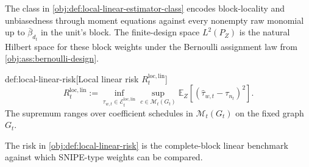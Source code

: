 \documentclass[11pt]{article}
\begin{document}
The class in \cref{obj:def:local-linear-estimator-class} encodes block-locality and unbiasedness through moment equations against every nonempty raw monomial up to \(\bar\beta_{d_t}\) in the unit's block. The finite-design space \(L^2(P_Z)\) is the natural Hilbert space for these block weights under the Bernoulli assignment law from \cref{obj:ass:bernoulli-design}.

\begin{definitionv}{def:local-linear-risk}[Local linear risk $R_t^{\mathrm{loc,lin}}$]
\[
R_t^{\mathrm{loc,lin}}
:=
\inf_{\widehat\tau_{w,t}\in\mathcal E_t^{\mathrm{loc,lin}}}
\sup_{c\in\mathcal M_t(G_t)}
\mathbb E_Z\!\left[
\left(\widehat\tau_{w,t}-\tau_{n_t}\right)^2
\right].
\]
The supremum ranges over coefficient schedules in \(\mathcal M_t(G_t)\) on the fixed graph \(G_t\).
\end{definitionv}

The risk in \cref{obj:def:local-linear-risk} is the complete-block linear benchmark against which SNIPE-type weights can be compared.
\end{document}
